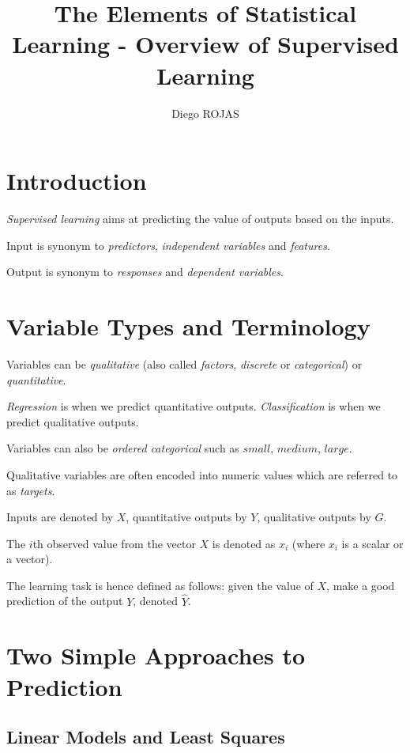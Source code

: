 \documentclass[12pt]{article}
\title{The Elements of Statistical Learning - Overview of Supervised Learning}
\author{Diego ROJAS}
\begin{document}
\maketitle

\section{Introduction}

\textit{Supervised learning} aims at predicting the value of outputs based on the inputs.

Input is synonym to \textit{predictors}, \textit{independent variables} and \textit{features}.

Output is synonym to \textit{responses} and \textit{dependent variables}.

\section{Variable Types and Terminology}

Variables can be \textit{qualitative} (also called \textit{factors}, \textit{discrete} or \textit{categorical}) or \textit{quantitative}.

\textit{Regression} is when we predict quantitative outputs. \textit{Classification} is when we predict qualitative outputs.

Variables can also be \textit{ordered categorical} such as $small$, $medium$, $large$.

Qualitative variables are often encoded into numeric values which are referred to as \textit{targets}.

Inputs are denoted by $X$, quantitative outputs by $Y$, qualitative outputs by $G$.

The $i$th observed value from the vector $X$ is denoted as $x_i$ (where $x_i$ is a scalar or a vector).

The learning task is hence defined as follows: given the value of $X$, make a good prediction of the output $Y$, denoted $\hat{Y}$.

\section{Two Simple Approaches to Prediction}

\subsection{Linear Models and Least Squares}
\end{document}
